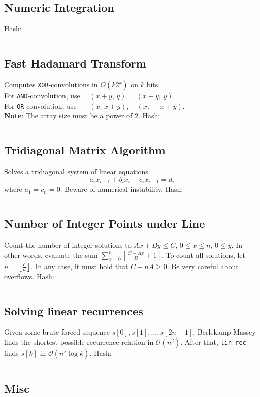 \documentclass[9pt,a4paper,landscape,oneside]{amsart}
\newcommand{\mintedstyle}[2]{\inputminted{#1}{code/#2}}
\newcommand{\code}[1]{ Hash: 
\mintedstyle{cpp}{#1}}
\newif\ifverbose
\begin{document}
\begin{multicols*}{3}
\subsection{Numeric Integration}
\ifverbose
Numeric integration using Simpson's rule (with $O(EPS^4)$ error).
\fi
\code{math/numeric_integration.cpp}

\subsection{Fast Hadamard Transform}
Computes \texttt{XOR}-convolutions in $O(k 2^k)$ on $k$ bits. \\
For \texttt{AND}-convolution, use $\quad  (x + y, \, y), \quad (x-y, \, y)$. \\
For \texttt{OR}-convolution, use $\quad\,\,\, (x, \, x + y), \quad (x, \, -x + y)$. \\
\textbf{Note}: The array size must be a power of $2$.
\code{math/fht.cpp}

\subsection{Tridiagonal Matrix Algorithm}

Solves a tridiagonal system of linear equations \[ a_i x_{i-1} + b_i x_i + c_i x_{i+1} = d_i \] where $a_1 = c_n = 0$.
Beware of numerical instability.
\code{math/tridiagonal.cpp}

\subsection{Number of Integer Points under Line}
Count the number of integer solutions to $Ax+By\leq C$, $0 \leq x \leq
n$, $0 \leq y$. In other words, evaluate the sum $\sum_{x=0}^n
\left\lfloor \frac{C-Ax}{B} + 1\right\rfloor$. To count all solutions,
let $n = \left\lfloor \frac{c}{a}\right\rfloor$. In any case, it must hold
that $C-nA \geq 0$. Be very careful about overflows.
\code{math/floor_sum.cpp}

\subsection{Solving linear recurrences}
Given some brute-forced sequence $s[0], s[1], \dots, s[2n-1]$, Berlekamp-Massey finds the shortest possible recurrence relation in $\mathcal{O}(n^2)$.
After that, \texttt{lin\_rec} finds $s[k]$ in $\mathcal{O}(n^2 \log k)$.
\code{other/berlekamp-massey.cpp}

\subsection{Misc}


\end{multicols*}
\end{document}
